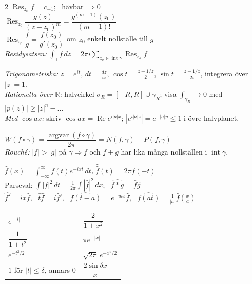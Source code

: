 \begin{multicols}{2}
$\operatorname{Res}_{z_0} f = c_{-1}$; \ hävbar $\Rightarrow 0$ \\
$\operatorname{Res}_{z_0} \dfrac{g(z)}{(z - z_0)^m} = \dfrac{g^{(m-1)}(z_0)}{(m - 1)!}$ \\
$\operatorname{Res}_{z_0} \dfrac{f}{g} = \dfrac{f(z_0)}{g'(z_0)}$ om $z_0$ enkelt nollställe till $g$ \\
\emph{Residysatsen:} $\displaystyle\int_\gamma f\,dz = 2\pi i \sum_{z_k \in \operatorname{int}\gamma} \operatorname{Res}_{z_k} f$

\emph{Trigonometriska:} $z = e^{it}$, $dt = \frac{dz}{iz}$, $\cos t = \frac{z + 1/z}{2}$, $\sin t = \frac{z - 1/z}{2i}$, integrera över $|z| = 1$. \\
\emph{Rationella över $\mathbb{R}$:} halvcirkel $\sigma_R = [-R, R] \cup \gamma_R$; visa $\int_{\gamma_R} \to 0$ med $|p(z)| \ge |z|^n - \dots$ \\
\emph{Med $\cos ax$:} skriv $\cos ax = \operatorname{Re} e^{i|a|x}$; $|e^{i|a|z}| = e^{-|a|y} \le 1$ i övre halvplanet.

$W(f \circ \gamma) = \dfrac{\operatorname{argvar}(f \circ \gamma)}{2\pi} = N(f, \gamma) - P(f, \gamma)$ \\
\emph{Rouché:} $|f| > |g|$ på $\gamma \Rightarrow f$ och $f + g$ har lika många nollställen i $\operatorname{int}\gamma$.

$\hat f(x) = \displaystyle\int_{-\infty}^\infty f(t)e^{-ixt}\,dt$, \quad $\hat{\hat f}(t) = 2\pi f(-t)$ \\
Parseval: $\int |f|^2\,dt = \frac{1}{2\pi}\int |\hat f|^2\,dx$; \ $\widehat{f * g} = \hat f \hat g$ \\
$\widehat{f'} = ix\hat f$, \ $\widehat{tf} = i\hat f'$, \ $\widehat{f(t - a)} = e^{-iax}\hat f$, \ $\widehat{f(at)} = \frac{1}{|a|}\hat f(\frac xa)$ \\
\begin{tabular}{@{}ll@{}}
  $e^{-|t|}$ & $\dfrac{2}{1 + x^2}$ \\
  $\dfrac{1}{1 + t^2}$ & $\pi e^{-|x|}$ \\
  $e^{-t^2/2}$ & $\sqrt{2\pi}\, e^{-x^2/2}$ \\
  $1$ för $|t| \le \delta$, annars $0$ & $\dfrac{2\sin \delta x}{x}$
\end{tabular}


\end{multicols}

